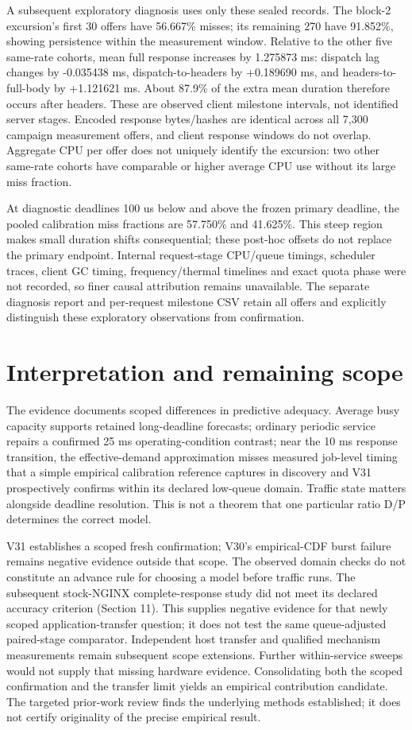 \documentclass[11pt,a4paper]{article}
\begin{document}
A subsequent exploratory diagnosis uses only these sealed records. The
block-2 excursion's first 30 offers have 56.667\% misses; its remaining 270
have 91.852\%, showing persistence within the measurement window. Relative
to the other five same-rate cohorts, mean full response increases by 1.275873
ms: dispatch lag changes by -0.035438 ms, dispatch-to-headers by +0.189690 ms,
and headers-to-full-body by +1.121621 ms. About 87.9\% of the extra mean duration
therefore occurs after headers. These are observed client milestone intervals,
not identified server stages. Encoded response bytes/hashes are identical
across all 7,300 campaign measurement offers, and client response windows do
not overlap. Aggregate CPU per offer does not uniquely identify the excursion:
two other same-rate cohorts have comparable or higher average CPU use without
its large miss fraction.

At diagnostic deadlines 100 us below and above the frozen primary deadline,
the pooled calibration miss fractions are 57.750\% and 41.625\%. This steep
region makes small duration shifts consequential; these post-hoc offsets do
not replace the primary endpoint. Internal request-stage CPU/queue timings,
scheduler traces, client GC timing, frequency/thermal timelines and exact
quota phase were not recorded, so finer causal attribution remains unavailable.
The separate diagnosis report and per-request milestone CSV retain all offers
and explicitly distinguish these exploratory observations from confirmation.

\section{Interpretation and remaining scope}

The evidence documents scoped differences in predictive adequacy. Average busy
capacity supports retained long-deadline forecasts; ordinary periodic service
repairs a confirmed 25 ms operating-condition contrast; near the 10 ms response
transition, the effective-demand approximation misses measured job-level
timing that a simple empirical calibration reference captures in discovery
and V31 prospectively confirms within its declared low-queue domain.
Traffic state matters alongside deadline resolution. This is not a theorem
that one particular ratio D/P determines the correct model.

V31 establishes a scoped fresh confirmation; V30's empirical-CDF burst failure
remains negative evidence outside that scope. The observed domain checks do
not constitute an advance rule for choosing a model before traffic runs.
The subsequent stock-NGINX complete-response study did not meet its declared
accuracy criterion (Section 11). This supplies negative evidence for that newly
scoped application-transfer question; it does not test the same queue-adjusted
paired-stage comparator. Independent host transfer and qualified mechanism
measurements remain subsequent scope extensions. Further within-service sweeps
would not supply that missing hardware evidence. Consolidating both the scoped
confirmation and the transfer limit yields an empirical contribution candidate.
The targeted prior-work review finds the underlying methods
established; it does not certify originality of the precise empirical result.
\end{document}
